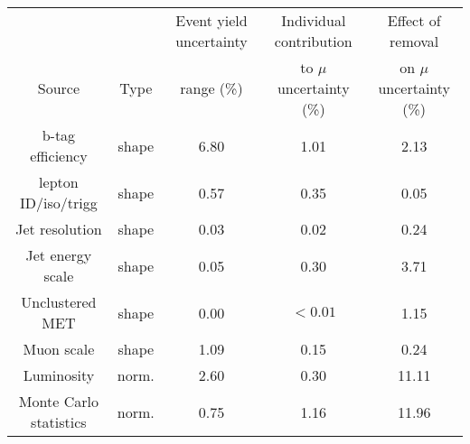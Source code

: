  \begin{adjustbox}{width=\textwidth,center=\textwidth}
\begin{tabular}{ccccc} \hline \hline
&  & Event yield uncertainty &Individual contribution & Effect of removal  \\
Source & Type & range (\%) &  to $\mu$ uncertainty (\%) & on $\mu$ uncertainty (\%) \\ \hline 
b-tag efficiency & shape & 6.80 & 1.01 & 2.13\\
lepton ID/iso/trigg & shape & 0.57 & 0.35 & 0.05\\
Jet resolution & shape & 0.03 & 0.02 & 0.24\\
Jet energy scale & shape & 0.05 & 0.30 & 3.71\\
Unclustered MET & shape & 0.00 & $<0.01$ & 1.15\\
Muon scale & shape & 1.09 & 0.15 & 0.24\\
Luminosity & norm. & 2.60 & 0.30 & 11.11\\
Monte Carlo statistics & norm. & 0.75 & 1.16 & 11.96\\
\hline 
\end{tabular}
 \end{adjustbox}
